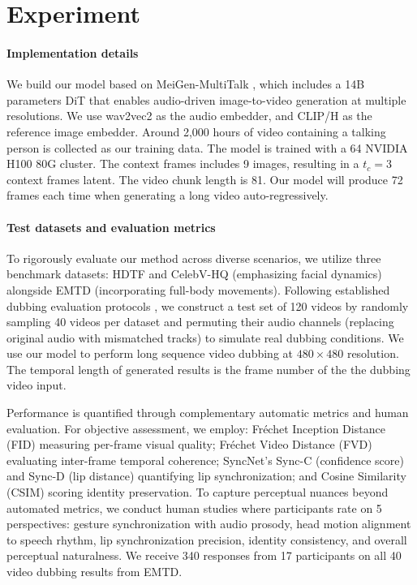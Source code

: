 \section{Experiment}
\paragraph{Implementation details}{
    We build our model based on MeiGen-MultiTalk \cite{kong2025let}, which includes a 14B parameters DiT that enables audio-driven image-to-video generation at multiple resolutions. We use wav2vec2 \cite{wav2vec2} as the audio embedder, and CLIP/H \cite{openclip} as the reference image embedder. Around 2,000 hours of video containing a talking person is collected as our training data. The model is trained with a 64 NVIDIA H100 80G cluster. The context frames includes 9 images, resulting in a $t_c = 3$ context frames latent. The video chunk length is 81. Our model will produce 72 frames each time when generating a long video auto-regressively.
}
\paragraph{Test datasets and evaluation metrics}{
    To rigorously evaluate our method across diverse scenarios, we utilize three benchmark datasets: HDTF \cite{hdtf} and CelebV-HQ \cite{celebvhq} (emphasizing facial dynamics) alongside EMTD \cite{emtd} (incorporating full-body movements). Following established dubbing evaluation protocols \cite{li2024latentsync, skyreelsaudio}, we construct a test set of 120 videos by randomly sampling 40 videos per dataset and permuting their audio channels (replacing original audio with mismatched tracks) to simulate real dubbing conditions. We use our model to perform long sequence video dubbing at $480\times 480$ resolution. The temporal length of generated results is the frame number of the the dubbing video input. 
    
    Performance is quantified through complementary automatic metrics and human evaluation. For objective assessment, we employ: Fréchet Inception Distance (FID) measuring per-frame visual quality; Fréchet Video Distance (FVD) evaluating inter-frame temporal coherence; SyncNet's Sync-C (confidence score) and Sync-D (lip distance) quantifying lip synchronization; and Cosine Similarity (CSIM) scoring identity preservation. To capture perceptual nuances beyond automated metrics, we conduct human studies where participants rate on 5 perspectives: gesture synchronization with audio prosody, head motion alignment to speech rhythm, lip synchronization precision, identity consistency, and overall perceptual naturalness. We receive 340 responses from 17 participants on all 40 video dubbing results from EMTD. 
}

